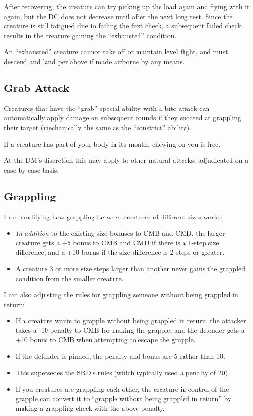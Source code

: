 After recovering, the creature can try picking up the load again and flying
with it again, but the DC does not decrease until after the next long rest.
Since the creature is still fatigued due to failing the first check, a
subsequent failed check results in the creature gaining the ``exhausted''
condition.

An ``exhausted'' creature cannot take off or maintain level flight, and must
descend and land per above if made airborne by any means.

%
\subsection{Grab Attack}

Creatures that have the ``grab'' special ability with a bite attack can
automatically apply damage on subsequent rounds if they succeed at grappling
their target (mechanically the same as the ``constrict'' ability).

If a creature has part of your body in its mouth, chewing on you is free.

At the DM's discretion this may apply to other natural attacks, adjudicated
on a case-by-case basis.

%
\subsection{Grappling}

I am modifying how grappling between creatures of different sizes works:
\begin{itemize}
\item \textit{In addition} to the existing size bonuses to CMB and CMD, the
larger creature gets a +5 bonus to CMB and CMD if there is a 1-step size
difference, and a +10 bonus if the size difference is 2 steps or greater.
\item A creature 3 or more size steps larger than another never gains the
grappled condition from the smaller creature.
\end{itemize}

I am also adjusting the rules for grappling someone without being grappled
in return:
\begin{itemize}
\item If a creature wants to grapple without being grappled in return, the
attacker takes a -10 penalty to CMB for making the grapple, and the defender
gets a +10 bonus to CMB when attempting to escape the grapple.
\item If the defender is pinned, the penalty and bonus are 5 rather than 10.
\item This supersedes the SRD's rules (which typically used a penalty of 20).
\item If you creatures are grappling each other, the creature in control of
the grapple can convert it to ``grapple without being grappled in return''
by making a grappling check with the above penalty.
\end{itemize}


